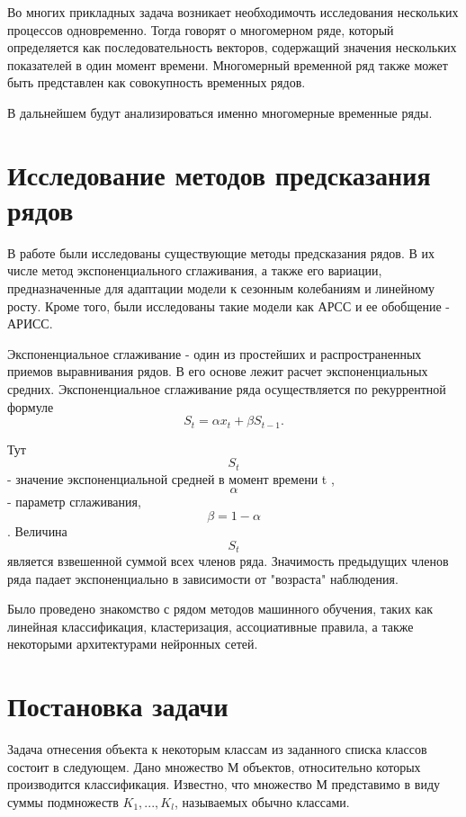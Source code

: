 \documentclass{article}
\begin{document}
\par{
Во многих прикладных задача возникает необходимочть исследования нескольких процессов одновременно. Тогда говорят о многомерном ряде, который определяется как последовательность векторов, содержащий значения нескольких показателей в один момент времени. Многомерный временной ряд также может быть представлен как совокупность временных рядов. 
}

\par{
В дальнейшем будут анализироваться именно многомерные временные ряды. 
}

\newpage

\section{Исследование методов предсказания рядов}
\par{
В работе были исследованы существующие методы предсказания рядов. В их числе метод экспоненциального сглаживания, а также его вариации, предназначенные для адаптации модели к сезонным колебаниям и линейному росту. Кроме того, были исследованы такие модели как АРСС и ее обобщение - АРИСС. \cite{lukashin2003} 
}

\par{
Экспоненциальное сглаживание - один из простейших и распространенных приемов выравнивания рядов. В его основе лежит расчет экспоненциальных средних. Экспоненциальное сглаживание ряда осуществляется по рекуррентной формуле
}
\begin{equation}
S_t = \alpha x_t + \beta S_{t-1}.
\end{equation}

\par{
Тут $$S_t$$ -  значение экспоненциальной средней в момент времени t , $$\alpha$$ - параметр сглаживания, $$\beta = 1 - \alpha$$. Величина $$S_t$$ является взвешенной суммой всех членов ряда. Значимость предыдущих членов ряда падает экспоненциально в зависимости от "возраста" наблюдения. \cite{lukashin2003} 
}

\par{
Было проведено знакомство с рядом методов машинного обучения, таких как линейная классификация, кластеризация, ассоциативные правила, а также некоторыми архитектурами нейронных сетей.
}

\newpage
\section{Постановка задачи}
\par{
Задача отнесения объекта к некоторым классам из заданного списка классов состоит в следующем. Дано множество М объектов, относительно которых производится классификация. Известно, что множество М представимо в виду суммы подмножеств $K_1,...,K_l$, называемых обычно классами. 
}
\end{document}
